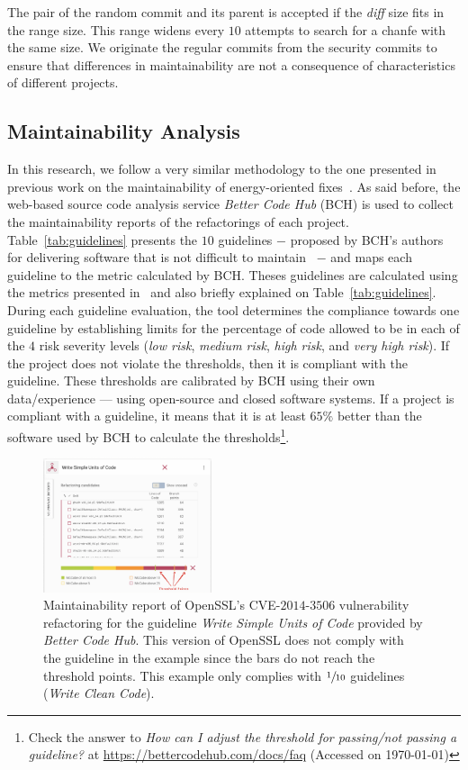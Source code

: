 \documentclass[10pt,conference]{IEEEtran}
\begin{document}
The pair of the random commit and its parent is accepted if the \emph{diff} 
size fits in the range size. This range widens every $10$ attempts to
search for a chanfe with the same size. We originate the regular commits from the 
security commits to ensure that differences in maintainability are not a 
consequence of characteristics of different projects.

\subsection{Maintainability Analysis}

In this research, we follow a very similar methodology to the one presented 
in previous work on the maintainability of energy-oriented fixes~\cite{cruz2019energyoriented}. 
As said before, the web-based source code analysis service \emph{Better Code
Hub} (BCH) is used to collect the maintainability reports of the refactorings of
each project. Table~\ref{tab:guidelines} presents the $10$ guidelines $-$ proposed
by BCH's authors for delivering software that is not difficult to
maintain~\cite{Visser:2016:OREILLY} $-$ and maps each guideline to the metric 
calculated by BCH. Theses guidelines are calculated using the metrics 
presented in~\cite{criteria:2017} and also briefly explained on Table~\ref{tab:guidelines}. 
During each guideline evaluation, the tool determines the compliance towards 
one guideline by establishing limits for the percentage of code allowed to be 
in each of the $4$ risk severity levels
(\emph{low risk}, \emph{medium risk}, \emph{high risk}, and \emph{very high
risk}). If the project does not violate the thresholds, then it is compliant
with the guideline. These thresholds are calibrated by BCH using their own
data/experience --- using open-source and closed software systems. If a project is
compliant with a guideline, it means that it is at least $65\%$ better than the
software used by BCH to calculate the thresholds\footnote{Check the answer to
\emph{How can I adjust the threshold for passing/not passing a guideline?} at
\url{https://bettercodehub.com/docs/faq} (Accessed on \today{})}.

\begin{figure}[h]
 	\centering 	
	\includegraphics[width=0.44\textwidth]{figures/bch_report.png}
 	\caption{Maintainability report of OpenSSL's CVE-$2014$-$3506$ vulnerability
refactoring for the guideline \emph{Write Simple Units of Code} provided by
\emph{Better Code Hub}. This version of OpenSSL does not comply with the
guideline in the example since the bars do not reach the threshold points. This
example only complies with $\sfrac{1}{10}$ guidelines (\emph{Write Clean Code}).}
	\label{fig:bchrep}
\end{figure}
\end{document}
